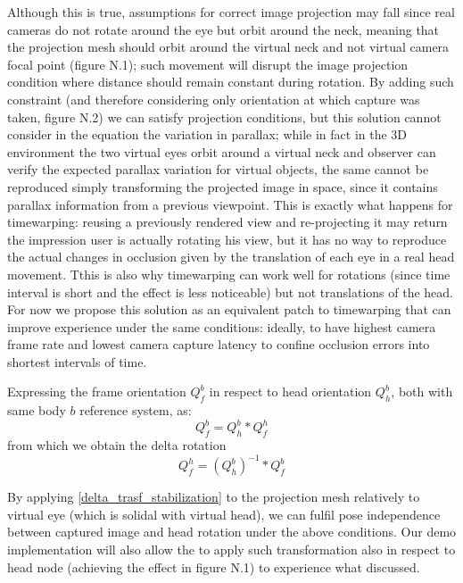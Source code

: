 Although this is true, assumptions for correct image projection may fall since real cameras do not rotate around the eye but orbit around the neck, meaning that the projection mesh should orbit around the virtual neck and not virtual camera focal point (figure N.1); such movement will disrupt the image projection condition where distance should remain constant during rotation. By adding such constraint (and therefore considering only orientation at which capture was taken, figure N.2) we can satisfy projection conditions, but this solution cannot consider in the equation the variation in parallax; while in fact in the 3D environment the two virtual eyes orbit around a virtual neck and observer can verify the expected parallax variation for virtual objects, the same cannot be reproduced simply transforming the projected image in space, since it contains parallax information from a previous viewpoint. This is exactly what happens for timewarping: reusing a previously rendered view and re-projecting it may return the impression user is actually rotating his view, but it has no way to reproduce the actual changes in occlusion given by the translation of each eye in a real head movement. Tthis is also why timewarping can work well for rotations (since time interval is short and the effect is less noticeable) but not translations of the head. For now we propose this solution as an equivalent patch to timewarping that can improve experience under the same conditions: ideally, to have highest camera frame rate and lowest camera capture latency to confine occlusion errors into shortest intervals of time.

Expressing the frame orientation $Q^{b}_{f}$ in respect to head orientation $Q^{b}_{h}$, both with same body $b$ reference system, as:
\begin{equation}
Q^{b}_{f}=Q^{b}_{h}*Q^{h}_{f}
\end{equation}
from which we obtain the delta rotation
\begin{equation}
Q^{h}_{f}=(Q^{b}_{h})^{-1}*Q^{b}_{f}
\label{delta_trasf_stabilization}
\end{equation}

By applying \ref{delta_trasf_stabilization} to the projection mesh relatively to virtual eye (which is solidal with virtual head), we can fulfil pose independence between captured image and head rotation under the above conditions. Our demo implementation will also allow the to apply such transformation also in respect to head node (achieving the effect in figure N.1) to experience what discussed.

